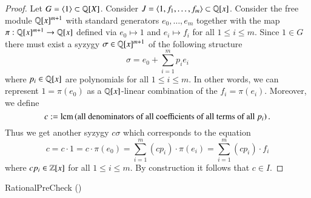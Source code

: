 \begin{proof}
Let $G = \langle 1 \rangle \subset \mathbb{Q}[X]$. Consider $J = \langle 1, f_1,\ldots,
f_m\rangle \subset \mathbb{Q}[x]$. Consider the free module $\mathbb{Q}[x]^{m+1}$ with
standard generators $e_0,\ldots,e_m$ together
with the map $\pi: \mathbb{Q}[x]^{m+1} \rightarrow \mathbb{Q}[x]$ defined via $e_0 \mapsto
1$ and $e_i \mapsto f_i$ for all $1 \leq i \leq m$.
Since $1 \in G$ there must exist a syzygy $\sigma \in \mathbb{Q}[x]^{m+1}$ of the
following structure
\[ \sigma = e_0 + \sum_{i=1}^m p_i e_i\]
where $p_i \in \mathbb{Q}[x]$ are polynomials for all $1\leq i \leq m$.
In other words, we can represent $1 = \pi(e_0)$ as a $\mathbb{Q}[x]$-linear
combination of the $f_i = \pi(e_i)$. Moreover, we define
\[c := \operatorname{lcm}\left(\text{all denominators of all
coefficients of all terms of all $p_i$}\right).\]
Thus we get another syzygy $c\sigma$ which corresponds to the equation
\[c = c \cdot 1 = c \cdot \pi(e_0) =\sum_{i=1}^m (c p_i)\cdot \pi(e_i) =
\sum_{i=1}^m (c p_i) \cdot f_i\]
where $c p_i \in \mathbb{Z}[x]$ for all $1 \leq i \leq m$.
By construction it follows that $c \in I$.
\end{proof}

\begin{algorithm}
\caption{RationalPreCheck (\rpc)} 
\label{alg:rpc}
\begin{algorithmic}[1]
\EndIf
{}
\end{algorithmic}
\end{algorithm}

